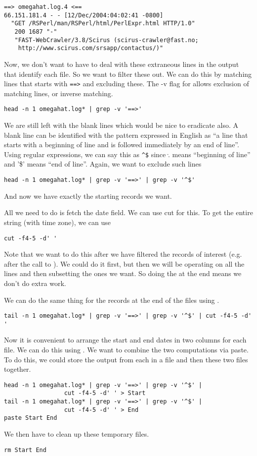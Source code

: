\begin{enumerate}
{{\begin{verbatim}
==> omegahat.log.4 <==
66.151.181.4 - - [12/Dec/2004:04:02:41 -0800] 
  "GET /RSPerl/man/RSPerl/html/PerlExpr.html HTTP/1.0"
   200 1687 "-" 
   "FAST-WebCrawler/3.8/Scirus (scirus-crawler@fast.no; 
    http://www.scirus.com/srsapp/contactus/)"
\end{verbatim}
}}
Now, we don't want to have to deal with these extraneous lines in the
output that identify each file.
So we want to filter these out.
We can do this by matching lines that starts with \verb+==>+
and excluding these. The -v flag for  
allows exclusion of matching lines, or inverse matching.
\begin{verbatim}
head -n 1 omegahat.log* | grep -v '==>'
\end{verbatim}
We are still left with the blank lines which would be nice to
eradicate also.
A blank line can be identified with the pattern
expressed in English as 
``a line that starts with a beginning of line and is followed
immediately by an end of line''.
Using regular expressions, we can say this as
\verb+^$+ since
$\hat.$ means ``beginning of line'' and '\$' means ``end of line''.
Again, we want to exclude such lines
\begin{verbatim}
head -n 1 omegahat.log* | grep -v '==>' | grep -v '^$'
\end{verbatim}
And now we have exactly the starting records we want. 

All we need to do is fetch the date field.
We can use cut for this.
To get the entire string (with time zone), we can use 
\begin{verbatim}
cut -f4-5 -d' '
\end{verbatim}
Note that we want to do this after we have filtered the records of
interest (e.g. after the call to ).  We could do it
first, but then we will be operating on all the lines and then
subsetting the ones we want. So doing the  at the end
means we don't do extra work.

We can do the same thing for the records at the end
of the files using .
\begin{verbatim}
tail -n 1 omegahat.log* | grep -v '==>' | grep -v '^$' | cut -f4-5 -d' '
\end{verbatim}

Now it is convenient to arrange the start and end dates
in two columns for each file.
We can do this using .
We want to combine the two computations via paste.
To do this, we could store the output from each
in a file and then  these
two files together.
\begin{verbatim}
head -n 1 omegahat.log* | grep -v '==>' | grep -v '^$' | 
                 cut -f4-5 -d' ' > Start
tail -n 1 omegahat.log* | grep -v '==>' | grep -v '^$' |
                 cut -f4-5 -d' ' > End
paste Start End
\end{verbatim}
We then have to clean up these temporary files.
\begin{verbatim}
rm Start End
\end{verbatim}


\end{enumerate}
